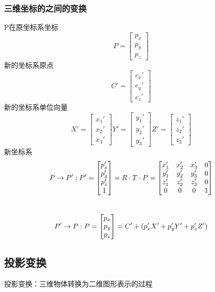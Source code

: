 \documentclass{article}
\begin{document}
\begin{CJK}{UTF8}{gbsn}
	\subsubsection{三维坐标的之间的变换}
	P在原坐标系坐标\\
	$$
	P=\begin{bmatrix}
	p_x\\p_y\\p_z
	\end{bmatrix}
	$$
	新的坐标系原点\\
	$$
	C'=\begin{bmatrix}
	c_x'\\c_y'\\c_z'
	\end{bmatrix}
	$$
	新的坐标系单位向量\\
	$$
	X'=\begin{bmatrix}
	x_1'\\x_2'\\x_3'
	\end{bmatrix}
	Y'=\begin{bmatrix}
	y_1'\\y_2'\\y_3'
	\end{bmatrix}
	Z'=\begin{bmatrix}
	z_1'\\z_2'\\z_3'
	\end{bmatrix}
	$$
	新坐标系\\
	$$
	P\rightarrow P':\\
	P'=\begin{bmatrix}
	p_x'\\p_y'\\p_z'\\1
	\end{bmatrix}=R\cdot T\cdot P\\
	=\begin{bmatrix}
	x_1'&x_2'&x_3'&0\\
	y_1'&y_2'&y_3'&0\\
	z_1'&z_2'&z_3'&0\\
	0&0&0&1
	\end{bmatrix}
	$$
	\\
	$$
	P'\rightarrow P:\\
	P=\begin{bmatrix}
	p_x\\p_y\\p_z
	\end{bmatrix}=C'+(p_x'X'+p_y'Y'+p_z'Z')\\
	$$
	\subsection{投影变换}
	投影变换：三维物体转换为二维图形表示的过程\\

\end{CJK}
\end{document}

